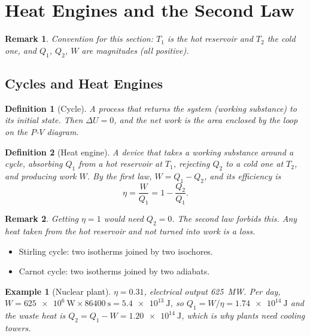 \documentclass{article}
\newtheorem{definition}{Definition}
\newtheorem*{example}{Example}
\newtheorem{remark}{Remark}
\begin{document}
\section{Heat Engines and the Second Law}
\label{sec:second-law}

\begin{remark}
    Convention for this section: $T_1$ is the hot reservoir and $T_2$ the cold one, and $Q_1$, $Q_2$, $W$ are magnitudes (all positive).
\end{remark}

\subsection{Cycles and Heat Engines}
\begin{definition}[Cycle]
    A process that returns the system (working substance) to its initial state. Then $\Delta U = 0$, and the net work is the area enclosed by the loop on the $P$-$V$ diagram.
\end{definition}

\begin{definition}[Heat engine]
    A device that takes a working substance around a cycle, absorbing $Q_1$ from a hot reservoir at $T_1$, rejecting $Q_2$ to a cold one at $T_2$, and producing work $W$. By the first law, $W = Q_1 - Q_2$, and its efficiency is
    \[\eta = \frac{W}{Q_1} = 1 - \frac{Q_2}{Q_1}.\]
\end{definition}

\begin{remark}
    Getting $\eta = 1$ would need $Q_2 = 0$. The second law forbids this. Any heat taken from the hot reservoir and not turned into work is a loss.
\end{remark}

\begin{itemize}
    \item Stirling cycle: two isotherms joined by two isochores.
    \item Carnot cycle: two isotherms joined by two adiabats.
\end{itemize}

\begin{example}[Nuclear plant]
    $\eta = 0.31$, electrical output \SI{625}{\mega\watt}. Per day, $W = \SI{625e6}{\watt} \times \SI{86400}{\second} = \SI{5.4e13}{\joule}$, so $Q_1 = W/\eta = \SI{1.74e14}{\joule}$ and the waste heat is $Q_2 = Q_1 - W = \SI{1.20e14}{\joule}$, which is why plants need cooling towers.
\end{example}
\end{document}
